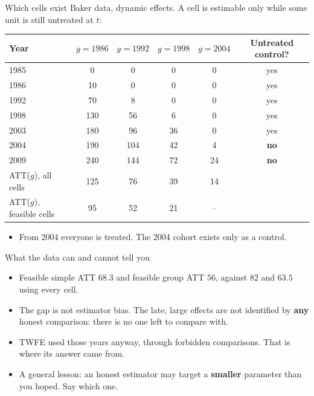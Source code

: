\documentclass[
  11pt,
  ignorenonframetext,
  aspectratio=169,
]{beamer}
\providecommand{\tightlist}{%
  \setlength{\itemsep}{0pt}\setlength{\parskip}{0pt}}
\begin{document}
\begin{frame}{Which cells exist}
\protect{}\label{which-cells-exist}
Baker data, dynamic effects. A cell is estimable only while some unit is
still untreated at \(t\):

\begin{center}\scriptsize
\begin{tabular}{lccccc}
\toprule
Year & $g = 1986$ & $g = 1992$ & $g = 1998$ & $g = 2004$ & Untreated control? \\
\midrule
1985 & 0 & 0 & 0 & 0 & yes \\
1986 & 10 & 0 & 0 & 0 & yes \\
1992 & 70 & 8 & 0 & 0 & yes \\
1998 & 130 & 56 & 6 & 0 & yes \\
2003 & 180 & 96 & 36 & 0 & yes \\
2004 & 190 & 104 & 42 & 4 & \textbf{no} \\
2009 & 240 & 144 & 72 & 24 & \textbf{no} \\
\midrule
ATT($g$), all cells & 125 & 76 & 39 & 14 & \\
ATT($g$), feasible cells & 95 & 52 & 21 & -- & \\
\bottomrule
\end{tabular}
\end{center}

\begin{itemize}
\tightlist
\item
  From 2004 everyone is treated. The 2004 cohort exists only as a
  control.
\end{itemize}
\end{frame}

\begin{frame}{What the data can and cannot tell you}
\protect{}\label{what-the-data-can-and-cannot-tell-you}
\begin{itemize}
\tightlist
\item
  Feasible simple ATT \(68.3\) and feasible group ATT \(56\), against
  \(82\) and \(63.5\) using every cell.
\item
  The gap is not estimator bias. The late, large effects are not
  identified by \textbf{any} honest comparison: there is no one left to
  compare with.
\item
  TWFE used those years anyway, through forbidden comparisons. That is
  where its answer came from.
\end{itemize}

\vspace{0.4em}

\begin{itemize}
\tightlist
\item
  A general lesson: an honest estimator may target a \textbf{smaller}
  parameter than you hoped. Say which one.
\end{itemize}
\end{frame}
\end{document}
